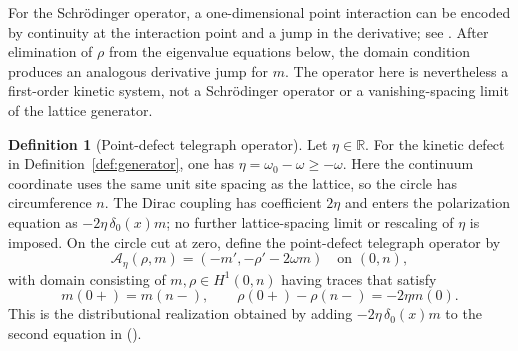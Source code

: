 \documentclass[twoside,10pt]{article}
\numberwithin{equation}{section}
\theoremstyle{slbody}
\theoremstyle{definition}
\newtheorem{definition}[theorem]{Definition}
\theoremstyle{remark}
\renewcommand{\eqref}[1]{%
  \textup{{\normalfont(\oldstylenums{\ref{#1}}}\normalfont)}}
\begin{document}
For the Schr\"odinger operator, a one-dimensional point interaction can be
encoded by continuity at the interaction point and a jump in the derivative;
see \cite[Part~I, Ch.~I.3, Thm.~3.1.1 and
Eq.~(3.1.9)]{AlbeverioGesztesyHoeghKrohnHolden2005}.
After elimination of $\rho$ from the eigenvalue equations below, the domain
condition produces an analogous derivative jump for $m$.  The operator here
is nevertheless a first-order kinetic system, not a Schr\"odinger operator or
a vanishing-spacing limit of the lattice generator.

\begin{definition}[Point-defect telegraph operator]
\label{def:telegraph-defect-operator}
Let $\eta\in\mathbb R$.  For the kinetic defect in
Definition~\ref{def:generator}, one has
$\eta=\omega_0-\omega\ge-\omega$.
Here the continuum coordinate uses the same unit site spacing as the
lattice, so the circle has circumference $n$.  The Dirac coupling has
coefficient $2\eta$ and enters the polarization equation as
$-2\eta\,\delta_0(x)m$; no further lattice-spacing limit or rescaling
of $\eta$ is imposed.
On the circle cut at zero, define the point-defect telegraph operator by
\[
 \mathcal A_\eta(\rho,m)=(-m',-\rho'-2\omega m)
 \quad\text{on }(0,n),
\]
with domain consisting of $m,\rho\in H^1(0,n)$ having traces that
satisfy
\begin{equation}\label{eq:telegraph-jump-domain}
 m(0+)=m(n-),\qquad
 \rho(0+)-\rho(n-)=-2\eta m(0).
\end{equation}
This is the distributional realization obtained by adding
$-2\eta\,\delta_0(x)m$ to the second equation in
\eqref{eq:telegraph-system}.
\end{definition}
\end{document}

